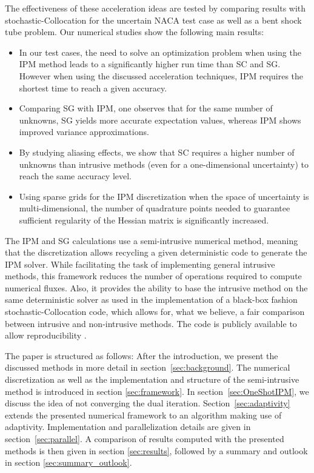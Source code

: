 The effectiveness of these acceleration ideas are tested by comparing results with stochastic-Collocation for the uncertain NACA test case as well as a bent shock tube problem. Our numerical studies show the following main results:
\begin{itemize}
\item In our test cases, the need to solve an optimization problem when using the IPM method leads to a significantly higher run time than SC and SG. However when using the discussed acceleration techniques, IPM requires the shortest time to reach a given accuracy.
\item Comparing SG with IPM, one observes that for the same number of unknowns, SG yields more accurate expectation values, whereas IPM shows improved variance approximations.
\item By studying aliasing effects, we show that SC requires a higher number of unknowns than intrusive methods (even for a one-dimensional uncertainty) to reach the same accuracy level.
\item Using sparse grids for the IPM discretization when the space of uncertainty is multi-dimensional, the number of quadrature points needed to guarantee sufficient regularity of the Hessian matrix is significantly increased.
\end{itemize}
The IPM and SG calculations use a semi-intrusive numerical method, meaning that the discretization allows recycling a given deterministic code to generate the IPM solver. While facilitating the task of implementing general intrusive methods, this framework reduces the number of operations required to compute numerical fluxes. Also, it provides the ability to base the intrusive method on the same deterministic solver as used in the implementation of a black-box fashion stochastic-Collocation code, which allows for, what we believe, a fair comparison between intrusive and non-intrusive methods. The code is publicly available to allow reproducibility \cite{uqcreator}.

The paper is structured as follows: After the introduction, we present the discussed methods in more detail in section~\ref{sec:background}. The numerical discretization as well as the implementation and structure of the semi-intrusive method is introduced in section \ref{sec:framework}. In section~\ref{sec:OneShotIPM}, we discuss the idea of not converging the dual iteration. Section~\ref{sec:adaptivity} extends the presented numerical framework to an algorithm making use of adaptivity. Implementation and parallelization details are given in section~\ref{sec:parallel}. A comparison of results computed with the presented methods is then given in section \ref{sec:results}, followed by a summary and outlook in section \ref{sec:summary_outlook}.

